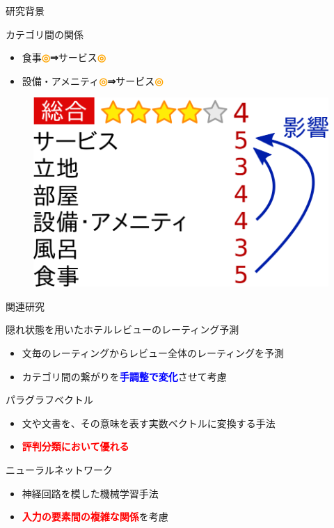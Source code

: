 \documentclass[aspectratio=43,unicode,10pt]{beamer}
\newcommand{\fire}[1]{\textcolor{red}{\textbf{#1}}}
\newcommand{\freeze}[1]{\textcolor{blue}{\textbf{#1}}}
\newcommand{\then}{\textcolor{ttiblue}{\textbf{⇒}}\hspace{1ex}}
\newcommand{\up}{\textcolor{orange}{\textbf{◎}}\hspace{1ex}}
\begin{document}
\begin{frame}{研究背景}{}
  \begin{block}{カテゴリ間の関係}
    \begin{itemize}
      \item 食事\up \then サービス\up
      \item 設備・アメニティ\up \then サービス\up
    \end{itemize}
    \begin{figure}
      \includegraphics[width=0.5\linewidth]
                      {fig/relations_among_rating_categories.png}
    \end{figure}
  \end{block}
\end{frame}

\begin{frame}{関連研究}{}
  \begin{block}{隠れ状態を用いたホテルレビューのレーティング予測}
    \begin{itemize}
      \item 文毎のレーティングからレビュー全体のレーティングを予測
      \item カテゴリ間の繋がりを\freeze{手調整で変化}させて考慮
    \end{itemize}
  \end{block}
  \begin{block}{パラグラフベクトル}{}
    \begin{itemize}
      \item 文や文書を、その意味を表す実数ベクトルに変換する手法
      \item \fire{評判分類において優れる}
    \end{itemize}
  \end{block}
  \begin{block}{ニューラルネットワーク}{}
    \begin{itemize}
      \item 神経回路を模した機械学習手法
      \item \fire{入力の要素間の複雑な関係}を考慮
    \end{itemize}
  \end{block}
\end{frame}
\end{document}
